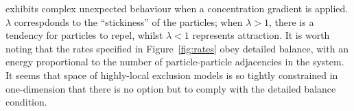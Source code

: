 exhibits complex unexpected behaviour when a concentration gradient is applied. $\lambda$ correspdonds to the ``stickiness'' of the particles; when $\lambda>1$, there is a tendency for particles to repel, whilst $\lambda < 1$ represents attraction.
It is worth noting that the rates specified in Figure~\ref{fig:rates} obey detailed balance,  %
with an energy proportional to the number of particle-particle adjacencies
in the system. It seems that space of highly-local exclusion models is so tightly constrained in one-dimension that there is no option but to comply with the detailed balance condition.


